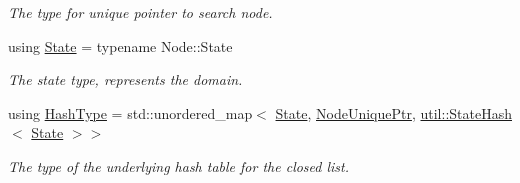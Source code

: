 \begin{DoxyCompactItemize}
\begin{DoxyCompactList}\small\item\em The type for unique pointer to search node. \end{DoxyCompactList}\item 
using \hyperlink{structslb_1_1core_1_1sb_1_1OpenClosedList_abf97b928a4672403ae4cbc256992d629}{State} = typename Node\+::\+State\hypertarget{structslb_1_1core_1_1sb_1_1OpenClosedList_abf97b928a4672403ae4cbc256992d629}{}\label{structslb_1_1core_1_1sb_1_1OpenClosedList_abf97b928a4672403ae4cbc256992d629}

\begin{DoxyCompactList}\small\item\em The state type, represents the domain. \end{DoxyCompactList}\item 
using \hyperlink{structslb_1_1core_1_1sb_1_1OpenClosedList_a32a2b03f9f64969e70977f9b5f858b3f}{Hash\+Type} = std\+::unordered\+\_\+map$<$ \hyperlink{structslb_1_1core_1_1sb_1_1OpenClosedList_abf97b928a4672403ae4cbc256992d629}{State}, \hyperlink{structslb_1_1core_1_1sb_1_1OpenClosedList_a2e2e18ca368c353ff032fa3f3dd8f1e9}{Node\+Unique\+Ptr}, \hyperlink{structslb_1_1core_1_1util_1_1StateHash}{util\+::\+State\+Hash}$<$ \hyperlink{structslb_1_1core_1_1sb_1_1OpenClosedList_abf97b928a4672403ae4cbc256992d629}{State} $>$$>$\hypertarget{structslb_1_1core_1_1sb_1_1OpenClosedList_a32a2b03f9f64969e70977f9b5f858b3f}{}\label{structslb_1_1core_1_1sb_1_1OpenClosedList_a32a2b03f9f64969e70977f9b5f858b3f}

\begin{DoxyCompactList}\small\item\em The type of the underlying hash table for the closed list. \end{DoxyCompactList}\end{DoxyCompactItemize}
